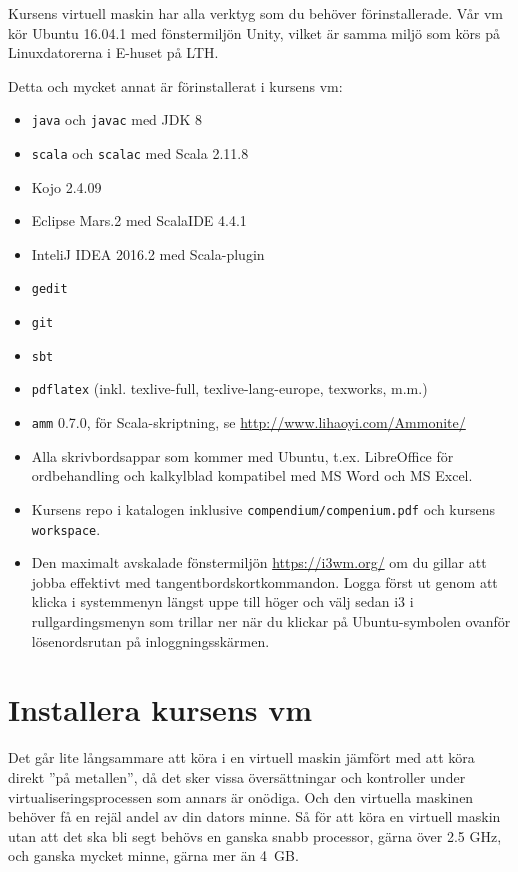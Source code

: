 Kursens virtuell maskin har alla verktyg som du behöver förinstallerade.  Vår vm kör Ubuntu 16.04.1 med fönstermiljön Unity, vilket är samma miljö som körs på Linuxdatorerna i E-huset på LTH. 

Detta och mycket annat är förinstallerat i kursens vm:

\begin{itemize}
\item \texttt{java} och \texttt{javac} med JDK 8
\item \texttt{scala} och \texttt{scalac} med Scala 2.11.8
\item Kojo 2.4.09
\item Eclipse Mars.2 med ScalaIDE 4.4.1
\item InteliJ IDEA 2016.2 med Scala-plugin
\item \texttt{gedit}
\item \texttt{git}
\item \texttt{sbt}
\item \texttt{pdflatex} (inkl. texlive-full, texlive-lang-europe, texworks, m.m.) 
\item \texttt{amm} 0.7.0, för Scala-skriptning, se \url{http://www.lihaoyi.com/Ammonite/}
\item Alla skrivbordsappar som kommer med Ubuntu, t.ex. LibreOffice för ordbehandling och kalkylblad kompatibel med MS Word och MS Excel.
\item Kursens repo i katalogen  inklusive  \texttt{compendium/compenium.pdf} och kursens \texttt{workspace}.
\item Den maximalt avskalade fönstermiljön \url{https://i3wm.org/} om du gillar att jobba effektivt med tangentbordskortkommandon. Logga först ut genom att klicka i systemmenyn längst uppe till höger och välj sedan i3 i rullgardingsmenyn som trillar ner när du klickar på Ubuntu-symbolen ovanför lösenordsrutan på inloggningsskärmen.
\end{itemize}

\section{Installera kursens vm}

Det går lite långsammare att köra i en virtuell maskin jämfört med att köra direkt ''på metallen'', då det sker vissa översättningar och kontroller under virtualiseringsprocessen som annars är onödiga. Och den virtuella maskinen behöver få en rejäl andel av din dators minne. Så för att köra en virtuell maskin utan att det ska bli segt behövs en ganska snabb processor, gärna över 2.5 GHz, och ganska mycket minne, gärna mer än 4~GB. 

